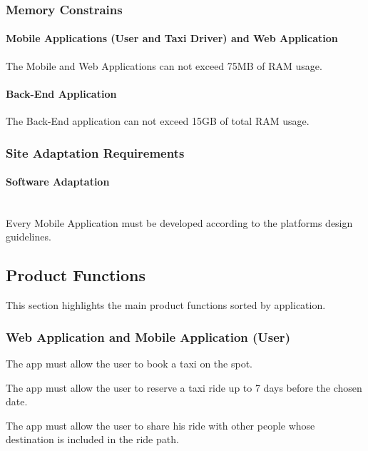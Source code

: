 \documentclass[12pt, a4paper]{article}
\begin{document}
\subsubsection{Memory Constrains} 

\label{ssub:memory_constrains}
\paragraph{Mobile Applications (User and Taxi Driver) and Web Application}
The Mobile and Web Applications can not exceed 75MB of RAM usage.
\paragraph{Back-End Application}
The Back-End application can not exceed 15GB of total RAM usage.

\subsubsection{Site Adaptation Requirements} 
\label{ssub:site_adaptation_requirements}
\paragraph{Software Adaptation} \mbox{} \\
Every Mobile Application must be developed according to the platforms design guidelines.

\subsection{Product Functions} 
\label{sub:product_functions}
This section highlights the main product functions sorted by application.

\subsubsection{Web Application and Mobile Application (User)}
\label{ssub:web_application_and_mobile_application_}
\begin{enumerate} [label = \textbf{[F\arabic*]}]
	\item  The app must allow the user to book a taxi on the spot.
	\item  The app must allow the user to reserve a taxi ride up to 7 days before the chosen date.
	\item  The app must allow the user to share his ride with other people whose destination is included in the ride path.
\end{enumerate}
\end{document}

